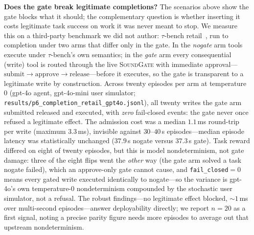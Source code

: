 \documentclass[10pt,journal,compsoc]{IEEEtran}
\newcommand{\sys}{\textsc{SoundGate}}
\begin{document}
\noindent\textbf{Does the gate break legitimate completions?}
The scenarios above show the gate blocks what it should; the complementary
question is whether inserting it costs legitimate task success on work it was
never meant to stop. We measure this on a third-party benchmark we did not
author: $\tau$-bench retail~\cite{taubench24}, run to completion under two arms
that differ only in the gate. In the \emph{nogate} arm tools execute under
$\tau$-bench's own semantics; in the \emph{gate} arm every consequential (write)
tool is routed through the live \sys{} with immediate approval---%
$\text{submit}\rightarrow\text{approve}\rightarrow\text{release}$---before it
executes, so the gate is transparent to a legitimate write by construction.
Across twenty episodes per arm at temperature~$0$ (\textsf{gpt-4o} agent,
\textsf{gpt-4o-mini} user simulator; \texttt{results/p6\_completion\_\-retail\_\-gpt4o.jsonl}),
all twenty writes the gate arm submitted released and executed, with
\emph{zero} fail-closed events: the gate never once refused a legitimate
effect. The admission cost was a median $1.1$\,ms round-trip per write
(maximum $3.3$\,ms), invisible against $30$--$40$\,s episodes---median episode
latency was statistically unchanged ($37.9$\,s nogate versus $37.3$\,s gate).
Task reward differed on eight of twenty episodes, but this is model
nondeterminism, not gate damage: three of the eight flips went the \emph{other}
way (the gate arm solved a task nogate failed), which an approve-only gate
cannot cause, and \texttt{fail\_closed}${=}0$ means every gated write executed
identically to nogate---so the variance is \textsf{gpt-4o}'s own
temperature-$0$ nondeterminism compounded by the stochastic user simulator, not
a refusal. The robust findings---no legitimate effect blocked, ${\sim}1$\,ms
over multi-second episodes---answer deployability directly; we report $n{=}20$
as a first signal, noting a precise parity figure needs more episodes to
average out that upstream nondeterminism.
\end{document}
